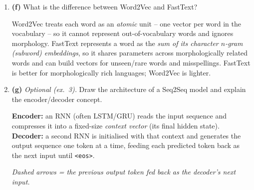 \documentclass[10pt,a4paper]{article}
\newcommand{\q}[1]{\item #1}
\begin{document}
\begin{enumerate}[leftmargin=*,label=\textbf{Q\arabic*.}]
\q \textbf{(f)} What is the difference between Word2Vec and FastText?
\begin{answerbox}
Word2Vec treats each word as an \emph{atomic} unit -- one vector per word in the vocabulary -- so it cannot represent out-of-vocabulary words and ignores morphology. FastText represents a word as the \emph{sum of its character $n$-gram (subword) embeddings}, so it shares parameters across morphologically related words and can build vectors for unseen/rare words and misspellings. FastText is better for morphologically rich languages; Word2Vec is lighter.
\end{answerbox}

\q \textbf{(g)} \textit{Optional (ex.\ 3).} Draw the architecture of a Seq2Seq model and explain the encoder/decoder concept.
\begin{answerbox}
\textbf{Encoder:} an RNN (often LSTM/GRU) reads the input sequence and compresses it into a fixed-size \emph{context vector} (its final hidden state). \textbf{Decoder:} a second RNN is initialised with that context and generates the output sequence one token at a time, feeding each predicted token back as the next input until \texttt{<eos>}.

\begin{center}
\end{center}
\textit{Dashed arrows = the previous output token fed back as the decoder's next input.}
\end{answerbox}


\end{enumerate}
\end{document}
